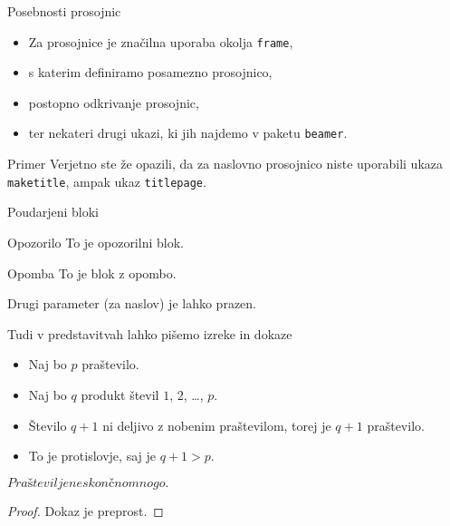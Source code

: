 \begin{frame}{Posebnosti prosojnic}
	\begin{itemize}
		\item<1-> Za prosojnice je značilna uporaba okolja \texttt{frame},
		\item<2-> s katerim definiramo posamezno prosojnico,
		\item<3-> postopno odkrivanje prosojnic,
		\item<4-> ter nekateri drugi ukazi, ki jih najdemo v paketu \texttt{beamer}.
	\end{itemize}
	\begin{exampleblock}{Primer}
		Verjetno ste že opazili, da za naslovno prosojnico niste uporabili
		ukaza \texttt{maketitle}, ampak ukaz \texttt{titlepage}.
	\end{exampleblock}
\end{frame}

\begin{frame}{Poudarjeni bloki}
	\begin{alertblock}{Opozorilo}
		To je opozorilni blok.
	\end{alertblock}
	\begin{exampleblock}{Opomba}
		To je blok z opombo.
	\end{exampleblock}
		Drugi parameter (za naslov) je lahko prazen. 

\end{frame}

\begin{frame}{Tudi v predstavitvah lahko pišemo izreke in dokaze}
	\begin{itemize}
		\item<1-> Naj bo $p$  praštevilo.
		\item<2-> Naj bo $q$ produkt števil $1$, $2$, \ldots, $p$.
		\item<3-> Število $q+1$ ni deljivo z nobenim praštevilom, torej je $q+1$ praštevilo.
		\item<4-> To je protislovje, saj je $q+1>p$. \qedhere
	\end{itemize}
	\begin{izrek}
	   $Praštevil je neskončno mnogo.$
	\end{izrek}
	\begin{proof}
	   Dokaz je preprost.	
	\end{proof}
 \end{frame}
 
